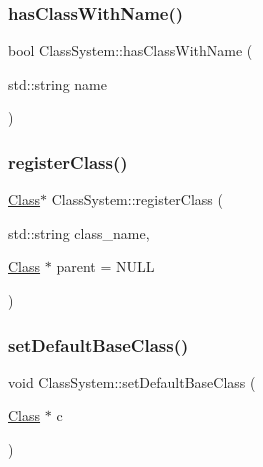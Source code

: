 \subsubsection{\texorpdfstring{has\+Class\+With\+Name()}{hasClassWithName()}}
{\footnotesize\ttfamily bool Class\+System\+::has\+Class\+With\+Name (\begin{DoxyParamCaption}\item[{std\+::string}]{name }\end{DoxyParamCaption})}

\mbox{\label{classClassSystem_a02f4790dd9b8fa8808a4e17f1e152281}} 
\subsubsection{\texorpdfstring{register\+Class()}{registerClass()}}
{\footnotesize\ttfamily \hyperlink{classClass}{Class}$\ast$ Class\+System\+::register\+Class (\begin{DoxyParamCaption}\item[{std\+::string}]{class\+\_\+name,  }\item[{\hyperlink{classClass}{Class} $\ast$}]{parent = {\ttfamily NULL} }\end{DoxyParamCaption})}

\mbox{\label{classClassSystem_a10283c2e4e7cc89b213f6a32a0d709c1}} 
\subsubsection{\texorpdfstring{set\+Default\+Base\+Class()}{setDefaultBaseClass()}}
{\footnotesize\ttfamily void Class\+System\+::set\+Default\+Base\+Class (\begin{DoxyParamCaption}\item[{\hyperlink{classClass}{Class} $\ast$}]{c }\end{DoxyParamCaption})}

\mbox{\label{classClassSystem_ad54dfb82875034ec728a2e417108f164}} 
